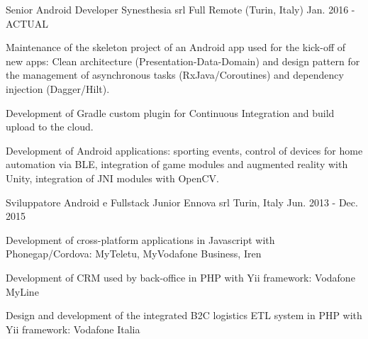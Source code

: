 


\begin{cventries}


\cventry
{Senior Android Developer} %
{Synesthesia srl} %
{Full Remote (Turin, Italy)} %
{Jan. 2016 - ACTUAL} %
{ %
	\begin{cvitems}
		\item {Maintenance of the skeleton project of an Android app used for the kick-off of new apps: Clean architecture (Presentation-Data-Domain) and design pattern for the management of asynchronous tasks (RxJava/Coroutines) and dependency injection (Dagger/Hilt).}
		\item {Development of Gradle custom plugin for Continuous Integration and build upload to the cloud.}
		\item {Development of Android applications: sporting events, control of devices for home automation via BLE, integration of game modules and augmented reality with Unity, integration of JNI modules with OpenCV.}
	\end{cvitems}
}


\cventry
{Sviluppatore Android e Fullstack Junior} %
{Ennova srl} %
{Turin, Italy} %
{Jun. 2013 - Dec. 2015} %
{ %
	\begin{cvitems}
		\item {Development of cross-platform applications in Javascript with Phonegap/Cordova: MyTeletu, MyVodafone Business, Iren}
		\item {Development of CRM used by back-office in PHP with Yii framework: Vodafone MyLine}
		\item {Design and development of the integrated B2C logistics ETL system in PHP with Yii framework: Vodafone Italia}
	\end{cvitems}
}

\end{cventries}